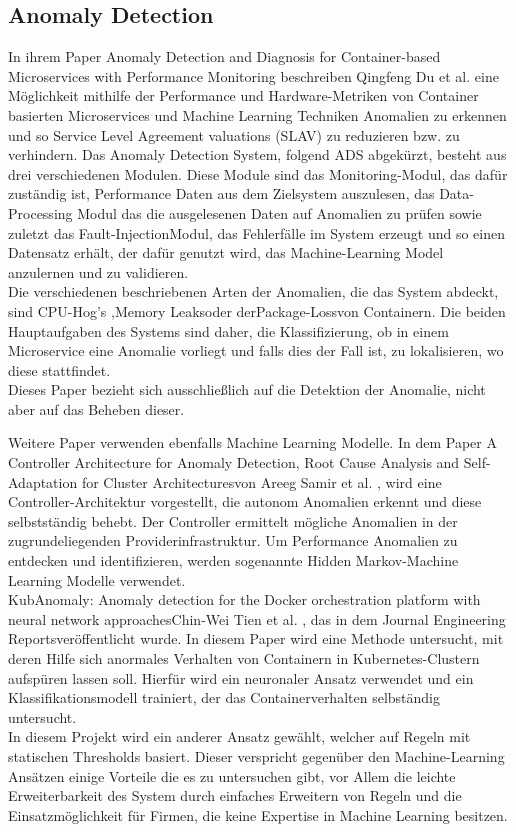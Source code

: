 \documentclass[a4paper,10pt]{scrartcl}
\begin{document}
\subsection{Anomaly Detection}
In ihrem Paper \glqq Anomaly Detection and Diagnosis for Container-based Microservices with Performance Monitoring\grqq \cite{.09.07.2020} beschreiben Qingfeng Du et al. eine Möglichkeit mithilfe der Performance und Hardware-Metriken von Container basierten Microservices und Machine Learning Techniken  Anomalien zu erkennen und so Service Level Agreement valuations (SLAV) zu reduzieren bzw. zu verhindern. Das Anomaly Detection System, folgend ADS abgekürzt, besteht aus drei verschiedenen Modulen. Diese Module sind das Monitoring-Modul, das dafür zuständig ist, Performance Daten aus dem Zielsystem auszulesen, das Data-Processing Modul das die ausgelesenen Daten auf Anomalien zu prüfen sowie zuletzt das \glqq Fault-Injection\grqq Modul, das Fehlerfälle im System erzeugt und so einen Datensatz erhält, der dafür genutzt wird, das Machine-Learning Model anzulernen und zu validieren.\\
Die verschiedenen beschriebenen Arten der Anomalien, die das System abdeckt, sind \glqq CPU-Hog's \grqq ,\glqq Memory Leaks\grqq oder der\glqq Package-Loss\grqq von Containern. Die beiden Hauptaufgaben des Systems sind daher, die Klassifizierung, ob in einem Microservice eine Anomalie vorliegt und falls dies der Fall ist, zu lokalisieren, wo diese stattfindet.\\
Dieses Paper bezieht sich ausschließlich auf die Detektion der Anomalie, nicht aber auf das Beheben dieser.

Weitere Paper verwenden ebenfalls Machine Learning Modelle. In dem Paper \glqq A Controller Architecture for Anomaly Detection, Root Cause Analysis and Self-Adaptation for Cluster Architectures\grqq von Areeg Samir et al. \cite{.19.07.2020d} , wird eine Controller-Architektur vorgestellt, die autonom Anomalien erkennt und diese selbstständig behebt. Der Controller ermittelt mögliche Anomalien in der zugrundeliegenden Providerinfrastruktur. Um Performance Anomalien zu entdecken und identifizieren, werden sogenannte \glqq Hidden Markov\grqq -Machine Learning Modelle verwendet.\\

\glqq KubAnomaly: Anomaly detection for the Docker orchestration platform with neural network approaches\grqq Chin‐Wei Tien et al. \cite{Tien.2019}, das in dem Journal \glqq Engineering Reports\grqq veröffentlicht wurde. In diesem Paper wird eine Methode untersucht, mit deren Hilfe sich anormales Verhalten von Containern in Kubernetes-Clustern aufspüren lassen soll. Hierfür wird ein neuronaler Ansatz verwendet und ein Klassifikationsmodell trainiert, der das Containerverhalten selbständig untersucht.\\
In diesem Projekt wird ein anderer Ansatz gewählt, welcher auf Regeln mit statischen Thresholds basiert. Dieser verspricht gegenüber den Machine-Learning Ansätzen einige Vorteile die es zu untersuchen gibt, vor Allem die leichte Erweiterbarkeit des System durch einfaches Erweitern von Regeln und die Einsatzmöglichkeit für Firmen, die keine Expertise in Machine Learning besitzen.
\end{document}
